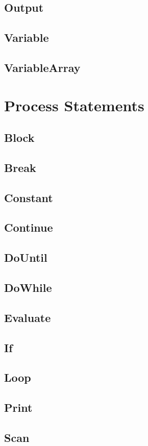 \subsection{Output}
\subsection{Variable}
\subsection{VariableArray}

\section{Process Statements}
\subsection{Block}
\subsection{Break}
\subsection{Constant}
\subsection{Continue}
\subsection{DoUntil}
\subsection{DoWhile}
\subsection{Evaluate}
\subsection{If}
\subsection{Loop}
\subsection{Print}
\subsection{Scan}
